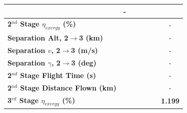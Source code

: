 \begin{table}[ht]
\begin{tabular}{l c c c c c c}
		& -
		\\
		\hline 
		\textbf{2$^{nd}$ Stage $\eta_{exergy}$ (\%)}
		& \textbf{\secondExergyEffISPThreeNinetyNoReturn}
		& \textbf{\secondExergyEffISPThreeNinetyFiveNoReturn}
		& \textbf{\secondExergyEffISPThreeStandardNoReturn}
		& \textbf{\secondExergyEffISPThreeOneHundredFiveNoReturn}
		& \textbf{\secondExergyEffISPThreeOneHundredTenNoReturn}
		& -
		\\
		\textbf{Separation Alt, 2$\rightarrow$3 (km)}
		& \secondthirdSeparationAltISPThreeNinetyNoReturn
		& \secondthirdSeparationAltISPThreeNinetyFiveNoReturn
		& \secondthirdSeparationAltISPThreeStandardNoReturn
		& \secondthirdSeparationAltISPThreeOneHundredFiveNoReturn
		& \secondthirdSeparationAltISPThreeOneHundredTenNoReturn
		& -
		\\
		\textbf{Separation $v$, 2$\rightarrow$3 (m/s)}
		& \secondthirdSeparationvISPThreeNinetyNoReturn
		& \secondthirdSeparationvISPThreeNinetyFiveNoReturn
		& \secondthirdSeparationvISPThreeStandardNoReturn
		& \secondthirdSeparationvISPThreeOneHundredFiveNoReturn
		& \secondthirdSeparationvISPThreeOneHundredTenNoReturn
		& -
		\\
		\textbf{Separation $\gamma$, 2$\rightarrow$3 (deg)}
		& \secondthirdSeparationgammaISPThreeNinetyNoReturn
		& \secondthirdSeparationgammaISPThreeNinetyFiveNoReturn
		& \secondthirdSeparationgammaISPThreeStandardNoReturn
		& \secondthirdSeparationgammaISPThreeOneHundredFiveNoReturn
		& \secondthirdSeparationgammaISPThreeOneHundredTenNoReturn
		& -
		\\
		\textbf{2$^{nd}$ Stage Flight Time (s)}
		& \secondFlightTimeISPThreeNinetyNoReturn
		& \secondFlightTimeISPThreeNinetyFiveNoReturn
		& \secondFlightTimeISPThreeStandardNoReturn
		& \secondFlightTimeISPThreeOneHundredFiveNoReturn
		& \secondFlightTimeISPThreeOneHundredTenNoReturn
		& -
		\\
		\textbf{2$^{nd}$ Stage Distance Flown (km)}
		& \SecondDistISPThreeNinetyNoReturn
		& \SecondDistISPThreeNinetyFiveNoReturn
		& \SecondDistISPThreeStandardNoReturn
		& \SecondDistISPThreeOneHundredFiveNoReturn
		& \SecondDistISPThreeOneHundredTenNoReturn
		& -
		\\
		\hline 
		\textbf{3$^{rd}$ Stage $\eta_{exergy}$ (\%)}
		& \textbf{\thirddExergyEffISPThreeNinetyNoReturn}
		& \textbf{\thirddExergyEffISPThreeNinetyFiveNoReturn}
		& \textbf{\thirddExergyEffISPThreeStandardNoReturn}
		& \textbf{\thirddExergyEffISPThreeOneHundredFiveNoReturn}
		& \textbf{\thirddExergyEffISPThreeOneHundredTenNoReturn}
		& \textbf{1.199}
		\\

\end{tabular}
\end{table}
